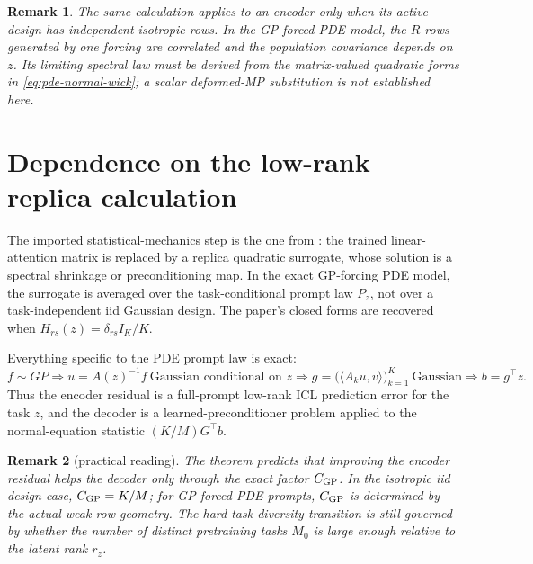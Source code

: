 \documentclass[11pt,a4paper]{article}
\newtheorem{remark}{Remark}
\theoremstyle{definition}
\begin{document}
\begin{remark}
The same calculation applies to an encoder only when its active design has
independent isotropic rows. In the GP-forced PDE model, the \(R\) rows
generated by one forcing are correlated and the population covariance depends
on \(z\). Its limiting spectral law must be derived from the matrix-valued
quadratic forms in \eqref{eq:pde-normal-wick}; a scalar deformed-MP
substitution is not established here.
\end{remark}

\section{Dependence on the low-rank replica calculation}

The imported statistical-mechanics step is the one from
\cite{takanami2026lowrankicl}: the trained linear-attention matrix is replaced
by a replica quadratic surrogate, whose solution is a spectral shrinkage or
preconditioning map.  In the exact GP-forcing PDE model, the surrogate is
averaged over the task-conditional prompt law $P_z$, not over a
task-independent iid Gaussian design. The paper's closed forms are recovered
when \(H_{rs}(z)=\delta_{rs}I_K/K\).

Everything specific to the PDE prompt law is exact:
\[
    f\sim GP
    \Rightarrow
    u=A(z)^{-1}f\ \text{Gaussian conditional on }z
    \Rightarrow
    g=\bigl(\langle A_ku,v\rangle\bigr)_{k=1}^{K}\ \text{Gaussian}
    \Rightarrow
    b=g^\top z .
\]
Thus the encoder residual is a full-prompt low-rank ICL prediction error for
the task $z$, and the decoder is a learned-preconditioner problem applied to
the normal-equation statistic $(K/M)G^\top b$.

\begin{remark}[practical reading]
The theorem predicts that improving the encoder residual helps the decoder only
through the exact factor $C_{\rm GP}$.  In the isotropic iid design case,
$C_{\rm GP}=K/M$; for GP-forced PDE prompts, $C_{\rm GP}$ is determined by the
actual weak-row geometry.  The hard task-diversity transition is still governed
by whether the number of distinct pretraining tasks $M_0$ is large enough
relative to the latent rank $r_z$.
\end{remark}
\end{document}

